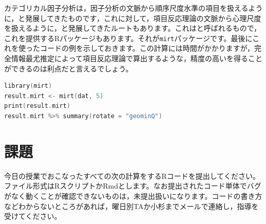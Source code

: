\documentclass{ltjsbook}
\begin{document}
カテゴリカル因子分析は，因子分析の文脈から順序尺度水準の項目を扱えるように，と発展してきたものです，これに対して，項目反応理論の文脈から心理尺度を扱えるように，と発展してきたルートもあります。これはと呼ばれるもので，これを提供するRパッケージもあります。それが\texttt{mirt}パッケージ\parencite{mirt}です。最後にこれを使ったコードの例を示しておきます。この計算には時間がかかりますが，完全情報最尤推定によって項目反応理論で算出するような，精度の高いを得ることができるのは利点だと言えるでしょう。

\begin{lstlisting}[language=c++,label={code:11_06b},caption={mirtの実行}]
library(mirt)
result.mirt <- mirt(dat, 5)
print(result.mirt)
result.mirt %>% summary(rotate = "geominQ")
\end{lstlisting}


\section{課題}
今日の授業でおこなったすべての次の計算をするRコードを提出してください。ファイル形式はRスクリプトかRmdとします。なお提出されたコード単体でバグがなく動くことが確認できないものは，未提出扱いになります。コードの書き方などわからないところがあれば，曜日別TAか小杉までメールで連絡し，指導を受けてください。
\end{document}

